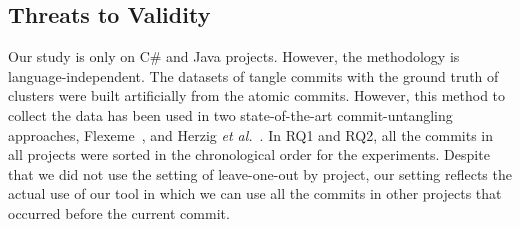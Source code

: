 \subsection{Threats to Validity}
\label{threats:sec}

Our study is only on C\# and Java projects. However, the methodology
is language-independent. The datasets of tangle commits with the
ground truth of clusters were built artificially from the atomic
commits. However, this method to collect the data has been used in two
state-of-the-art commit-untangling approaches,
Flexeme~\cite{flexeme-fse20}, and Herzig {\em et
  al.}~\cite{kim-msr13}. In RQ1 and RQ2, all the commits in all
projects were sorted in the chronological order for the
experiments. Despite that we did not use the setting of leave-one-out
by project, our setting reflects the actual use of our tool in which
we can use all the commits in other projects that occurred before the
current commit.
